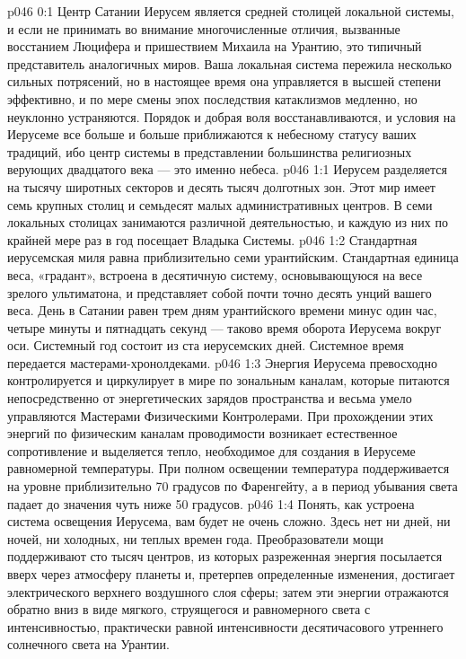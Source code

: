 \author{Архангел}
\vs p046 0:1 Центр Сатании Иерусем является средней столицей локальной системы, и если не принимать во внимание многочисленные отличия, вызванные восстанием Люцифера и пришествием Михаила на Урантию, это типичный представитель аналогичных миров. Ваша локальная система пережила несколько сильных потрясений, но в настоящее время она управляется в высшей степени эффективно, и по мере смены эпох последствия катаклизмов медленно, но неуклонно устраняются. Порядок и добрая воля восстанавливаются, и условия на Иерусеме все больше и больше приближаются к небесному статусу ваших традиций, ибо центр системы в представлении большинства религиозных верующих двадцатого века --- это именно небеса.
\vs p046 1:1 Иерусем разделяется на тысячу широтных секторов и десять тысяч долготных зон. Этот мир имеет семь крупных столиц и семьдесят малых административных центров. В семи локальных столицах занимаются различной деятельностью, и каждую из них по крайней мере раз в год посещает Владыка Системы.
\vs p046 1:2 \pc Стандартная иерусемская миля равна приблизительно семи урантийским. Стандартная единица веса, «градант», встроена в десятичную систему, основывающуюся на весе зрелого ультиматона, и представляет собой почти точно десять унций вашего веса. День в Сатании равен трем дням урантийского времени минус один час, четыре минуты и пятнадцать секунд --- таково время оборота Иерусема вокруг оси. Системный год состоит из ста иерусемских дней. Системное время передается мастерами\hyp{}хронолдеками.
\vs p046 1:3 \pc Энергия Иерусема превосходно контролируется и циркулирует в мире по зональным каналам, которые питаются непосредственно от энергетических зарядов пространства и весьма умело управляются Мастерами Физическими Контролерами. При прохождении этих энергий по физическим каналам проводимости возникает естественное сопротивление и выделяется тепло, необходимое для создания в Иерусеме равномерной температуры. При полном освещении температура поддерживается на уровне приблизительно 70 градусов по Фаренгейту, а в период убывания света падает до значения чуть ниже 50 градусов.
\vs p046 1:4 \pc Понять, как устроена система освещения Иерусема, вам будет не очень сложно. Здесь нет ни дней, ни ночей, ни холодных, ни теплых времен года. Преобразователи мощи поддерживают сто тысяч центров, из которых разреженная энергия посылается вверх через атмосферу планеты и, претерпев определенные изменения, достигает электрического верхнего воздушного слоя сферы; затем эти энергии отражаются обратно вниз в виде мягкого, струящегося и равномерного света с интенсивностью, практически равной интенсивности десятичасового утреннего солнечного света на Урантии.
